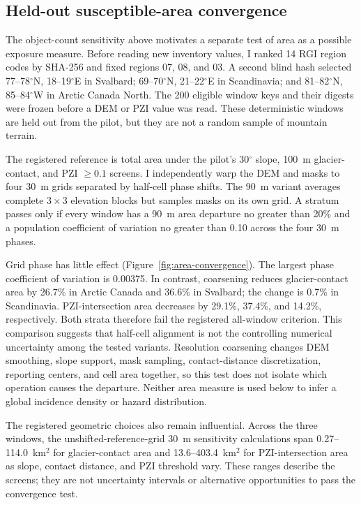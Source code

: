 \documentclass[11pt]{article}
\begin{document}
\subsection{Held-out susceptible-area convergence}

The object-count sensitivity above motivates a separate test of area as a
possible exposure measure. Before reading new inventory values, I ranked 14
RGI region codes by SHA-256 and fixed regions 07, 08, and 03. A second blind
hash selected 77--78$^\circ$N, 18--19$^\circ$E in Svalbard; 69--70$^\circ$N,
21--22$^\circ$E in Scandinavia; and 81--82$^\circ$N,
85--84$^\circ$W in Arctic Canada North. The 200 eligible window keys and their
digests were frozen before a DEM or PZI value was read. These deterministic
windows are held out from the pilot, but they are not a random sample of
mountain terrain.

The registered reference is total area under the pilot's 30$^\circ$ slope,
100~m glacier-contact, and PZI $\geq0.1$ screens. I independently warp the DEM
and masks to four 30~m grids separated by half-cell phase shifts. The 90~m
variant averages complete $3\times3$ elevation blocks but samples masks on its
own grid. A stratum passes only if every window has a 90~m area departure no
greater than 20\% and a population coefficient of variation no greater than
0.10 across the four 30~m phases.

Grid phase has little effect (Figure~\ref{fig:area-convergence}). The largest
phase coefficient of variation is 0.00375. In contrast, coarsening reduces
glacier-contact area by 26.7\% in Arctic Canada and 36.6\% in Svalbard; the
change is 0.7\% in Scandinavia. PZI-intersection area decreases by 29.1\%,
37.4\%, and 14.2\%, respectively. Both strata therefore fail the registered
all-window criterion. This comparison suggests that half-cell alignment is not
the controlling numerical uncertainty among the tested variants. Resolution
coarsening changes DEM smoothing, slope support, mask sampling,
contact-distance discretization, reporting centers, and cell area together,
so this test does not isolate which operation causes the departure. Neither
area measure is used below to infer a global incidence density or hazard
distribution.

The registered geometric choices also remain influential. Across the three
windows, the unshifted-reference-grid 30~m sensitivity calculations span
0.27--114.0~km$^2$ for glacier-contact area and 13.6--403.4~km$^2$ for
PZI-intersection area as slope, contact distance, and PZI threshold vary. These
ranges describe the screens; they are not uncertainty intervals or alternative
opportunities to pass the convergence test.
\end{document}
